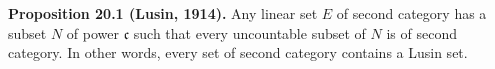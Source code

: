 \textbf{Proposition 20.1 (Lusin, 1914).} Any linear set $E$ of second category has a subset $N$ of power $\mathfrak{c}$ such that every uncountable subset of $N$ is of second category. In other words, every set of second category contains a Lusin set.
